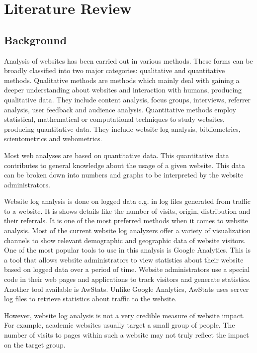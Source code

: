 \chapter{Literature Review}
\section{Background}

\noindent
Analysis of websites has been carried out in various methods. These forms can be broadly classified into two major categories: qualitative and quantitative methods. Qualitative methods are methods which mainly deal with gaining a deeper understanding about websites and interaction with humans, producing qualitative data. They include content analysis, focus groups, interviews, referrer analysis, user feedback and audience analysis. Quantitative methods employ statistical, mathematical or computational techniques to study websites, producing quantitative data. They include website log analysis, bibliometrics, scientometrics and webometrics.

\noindent
Most web analyses are based on quantitative data. This quantitative data contributes to general knowledge about the usage of a given website. This data can be broken down into numbers and graphs to be interpreted by the website administrators. 

\noindent
Website log analysis is done on logged data e.g. in log files generated from traffic to a website. It is shows details like the number of visits, origin, distribution and their referrals. It is one of the most preferred methods when it comes to website analysis. Most of the current website log analyzers offer a variety of visualization channels to show relevant demographic and geographic data of website visitors. One of the most popular tools to use in this analysis is Google Analytics. This is a tool that allows website administrators to view statistics about their website based on logged data over a period of time. Website administrators use a special code in their web pages and applications to track visitors and generate statistics. Another tool available is AwStats. Unlike Google Analytics, AwStats uses server log files to retrieve statistics about traffic to the website.

\noindent
However, website log analysis is not a very credible measure of website impact. For example, academic websites usually target a small group of people. The number of visits to pages within such a website may not truly reflect the impact on the target group. 

